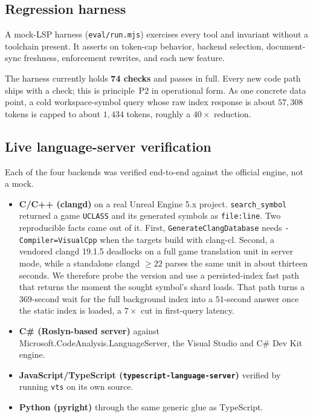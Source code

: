 \documentclass[11pt]{article}
\begin{document}
\subsection{Regression harness}
A mock-LSP harness (\texttt{eval/run.mjs}) exercises every tool and invariant
without a toolchain present. It asserts on token-cap behavior, backend selection,
document-sync freshness, enforcement rewrites, and each new feature.

The harness currently holds \textbf{74 checks} and passes in full. Every new code
path ships with a check; this is principle~P2 in operational form. As one concrete
data point, a cold workspace-symbol query whose raw index response is about
$57{,}308$ tokens is capped to about $1{,}434$ tokens, roughly a $40\times$
reduction.

\subsection{Live language-server verification}
Each of the four backends was verified end-to-end against the official engine, not a
mock.

\begin{itemize}
  \item \textbf{C/C++ (clangd)} on a real Unreal Engine 5.x project.
  \texttt{search\_symbol} returned a game \texttt{UCLASS} and its generated symbols
  as \texttt{file:line}. Two reproducible facts came out of it. First,
  \texttt{GenerateClangDatabase} needs \texttt{-Compiler=VisualCpp} when the targets
  build with clang-cl. Second, a vendored clangd 19.1.5 deadlocks on a full game
  translation unit in server mode, while a standalone clangd $\geq 22$ parses the
  same unit in about thirteen seconds. We therefore probe the version and use a
  persisted-index fast path that returns the moment the sought symbol's shard loads.
  That path turns a $369$-second wait for the full background index into a
  $51$-second answer once the static index is loaded, a $7\times$ cut in first-query
  latency.
  \item \textbf{C\# (Roslyn-based server)} against
  Microsoft.CodeAnalysis.LanguageServer, the Visual Studio and C\# Dev Kit engine.
  \item \textbf{JavaScript/TypeScript (\texttt{typescript-language-server})}
  verified by running \texttt{vts} on its own source.
  \item \textbf{Python (pyright)} through the same generic glue as TypeScript.
\end{itemize}
\end{document}
